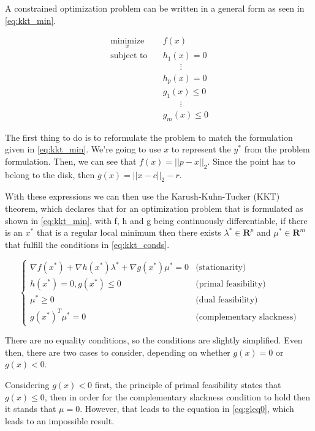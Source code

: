 A constrained optimization problem can be written in a general form as seen in \eqref{eq:kkt_min}.

\begin{equation}
\begin{aligned}
\label{eq:kkt_min}
\underset{x}{\text{minimize}} \quad & f(x) \\
\text{subject to} \quad & h_1(x) = 0 \\
                  & \qquad \vdots \\
                  & h_p(x) = 0 \\
                  & g_1(x) \leq 0 \\
                  & \qquad \vdots \\
                  & g_m(x) \leq 0
\end{aligned}
\end{equation}

The first thing to do is to reformulate the problem to match the formulation given in \eqref{eq:kkt_min}. We're going to use $x$ to represent the $y^*$ from the problem formulation. Then, we can see that $f(x) = ||p-x||_2$. Since the point has to belong to the disk, then $g(x) = ||x - c||_2 - r$. 

With these expressions we can then use the Karush-Kuhn-Tucker (KKT) theorem, which declares that for an optimization problem that is formulated as shown in \eqref{eq:kkt_min}, with f, h and g being continuously differentiable, if there is an $x^*$ that is a regular local minimum then there exists $\lambda^* \in \mathbf{R}^p$ and $\mu^* \in \mathbf{R}^m$ that fulfill the conditions in \eqref{eq:kkt_conds}.

\begin{equation}
\begin{cases}
\label{eq:kkt_conds}
	\nabla f(x^*) + \nabla h(x^*) \lambda^* + \nabla g(x^*) \mu^* = 0 & \text{(stationarity)} \\
	h(x^*) = 0, g(x^*) \leq 0 & \text{(primal feasibility)} \\
	\mu^* \geq 0 & \text{(dual feasibility)} \\
	g(x^*)^T \mu^* = 0 & \text{(complementary slackness)}
\end{cases}
\end{equation}

There are no equality conditions, so the conditions are slightly simplified. Even then, there are two cases to consider, depending on whether $g(x) = 0$ or $g(x) < 0$.

Considering $g(x) < 0$ first, the principle of primal feasibility states that $g(x) \leq 0$, then in order for the complementary slackness condition to hold then it stands that $\mu = 0$. However, that leads to the equation in \eqref{eq:gleq0}, which leads to an impossible result.

